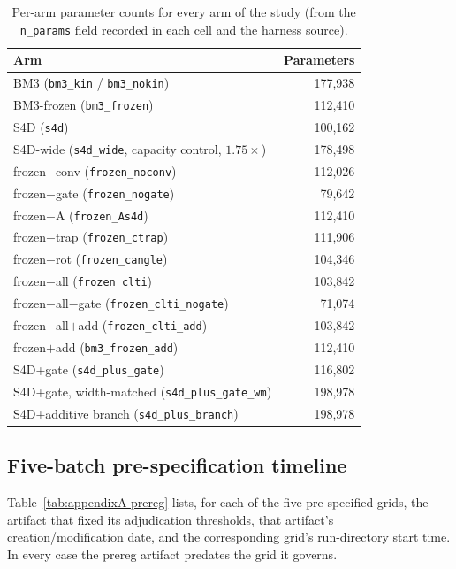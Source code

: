 \begin{table}[htbp]
\centering
\caption{Per-arm parameter counts for every arm of the study (from the \texttt{n\_params} field recorded in each cell and the harness source).}
\label{tab:appendixA-params}
\begin{tabular}{@{}lr@{}}
\toprule
Arm & Parameters \\
\midrule
BM3 (\texttt{bm3\_kin} / \texttt{bm3\_nokin}) & 177{,}938 \\
BM3-frozen (\texttt{bm3\_frozen}) & 112{,}410 \\
S4D (\texttt{s4d}) & 100{,}162 \\
S4D-wide (\texttt{s4d\_wide}, capacity control, $1.75\times$) & 178{,}498 \\
frozen$-$conv (\texttt{frozen\_noconv}) & 112{,}026 \\
frozen$-$gate (\texttt{frozen\_nogate}) & 79{,}642 \\
frozen$-$A (\texttt{frozen\_As4d}) & 112{,}410 \\
frozen$-$trap (\texttt{frozen\_ctrap}) & 111{,}906 \\
frozen$-$rot (\texttt{frozen\_cangle}) & 104{,}346 \\
frozen$-$all (\texttt{frozen\_clti}) & 103{,}842 \\
frozen$-$all$-$gate (\texttt{frozen\_clti\_nogate}) & 71{,}074 \\
frozen$-$all$+$add (\texttt{frozen\_clti\_add}) & 103{,}842 \\
frozen$+$add (\texttt{bm3\_frozen\_add}) & 112{,}410 \\
S4D+gate (\texttt{s4d\_plus\_gate}) & 116{,}802 \\
S4D+gate, width-matched (\texttt{s4d\_plus\_gate\_wm}) & 198{,}978 \\
S4D+additive branch (\texttt{s4d\_plus\_branch}) & 198{,}978 \\
\bottomrule
\end{tabular}
\end{table}

\subsection{Five-batch pre-specification timeline}
\label{app:fairness:prereg}

Table~\ref{tab:appendixA-prereg} lists, for each of the five pre-specified grids, the artifact that fixed its adjudication thresholds, that artifact's creation/modification date, and the corresponding grid's run-directory start time. In every case the prereg artifact predates the grid it governs.

